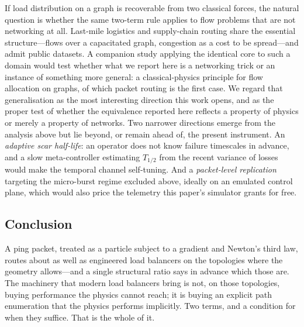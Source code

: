 If load distribution on a graph is recoverable from two classical forces, the
natural question is whether the same two-term rule applies to flow problems that
are not networking at all. Last-mile logistics and supply-chain routing share
the essential structure---flows over a capacitated graph, congestion as a cost
to be spread---and admit public datasets. A companion study applying the
identical core to such a domain would test whether what we report here is a
networking trick or an instance of something more general: a classical-physics
principle for flow allocation on graphs, of which packet routing is the first
case. We regard that generalisation as the most interesting direction this work
opens, and as the proper test of whether the equivalence reported here reflects
a property of physics or merely a property of networks.
Two narrower directions emerge from the analysis above but lie beyond, or remain ahead of, the present instrument. An
\emph{adaptive scar half-life}: an operator does not know failure
timescales in advance, and a slow meta-controller estimating $T_{1/2}$
from the recent variance of losses would make the temporal channel
self-tuning. And a \emph{packet-level replication} targeting the
micro-burst regime excluded above, ideally on an emulated control plane,
which would also price the telemetry this paper's simulator grants for
free.

\subsection{Conclusion}

A ping packet, treated as a particle subject to a gradient and Newton's third
law, routes about as well as engineered load balancers on the topologies where
the geometry allows---and a single structural ratio says in advance which those
are. The machinery that modern load balancers bring is not, on those
topologies, buying performance the physics cannot reach; it is buying an
explicit path enumeration that the physics performs implicitly. Two terms, and a
condition for when they suffice. That is the whole of it.


